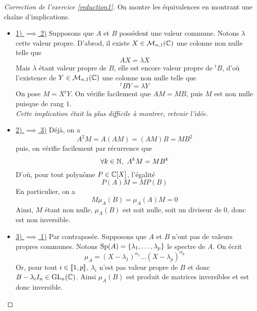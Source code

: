 \begin{proof}[Correction de l'exercice \ref{reduction1}]
	On montre les équivalences en montrant une chaîne d'implications.
	\begin{itemize}
		\item[] \underline{1) $\implies$ 2)} Supposons que $A$ et $B$ possèdent une valeur commune. Notons $\lambda$ cette valeur propre. D'abrod, il existe $X\in\mathcal M_{n,1}(\operatorname{\mathbb C})$ une colonne non nulle telle que \[AX=\lambda X\]
		Mais $\lambda$ étant valeur propre de $B$, elle est encore valeur propre de ${}^tB$, d'où l'existence de $Y\in\mathcal M_{n,1}(\operatorname{\mathbb C})$ une colonne non nulle telle que \[{}^tBY=\lambda Y\]
		On pose $M=X{}^tY$. On vérifie facilement que $AM=MB$, puis $M$ est non nulle puisque de rang $1$.\\


		\textit{Cette implication était la plus difficile à montrer, retenir l'idée.}
		\item[]\underline{2) $\implies$ 3)} Déjà, on a \[A^2M=A(AM)=(AM)B=MB^2\]
		puis, on vérifie facilement par récurrence que \[\forall k\in\operatorname{\mathbb N},\ A^kM=MB^k\]
		D'où, pour tout polynôme $P\in\operatorname{\mathbb C}[X]$, l'égalité \[P(A)M=MP(B)\]
		En particulier, on a \[M\mu_A(B)=\mu_A(A)M=0\] 
		Ainsi, $M$ étant non nulle, $\mu_A(B)$ est soit nulle, soit un diviseur de $0$, donc est non inversible.
		\item[]\underline{3) $\implies$ 1)} Par contraposée. Supposons que $A$ et $B$ n'ont pas de valeurs propres communes. Notons $\operatorname{Sp}(A)=\lbrace \lambda_1,\dots,\lambda_p\rbrace$ le spectre de $A$. On écrit \[\mu_A=(X-\lambda_1)^{\alpha_1}\dots(X-\lambda_p)^{\alpha_p}\]
		Or, pour tout $i\in[\![1,p]\!]$, $\lambda_i$ n'est pas valeur propre de $B$ et donc $B-\lambda_iI_n\in \operatorname{GL}_n(\operatorname{\mathbb C})$. Ainsi $\mu_A(B)$ est produit de matrices inversibles et est donc inversible.
	\end{itemize}	
\end{proof}

